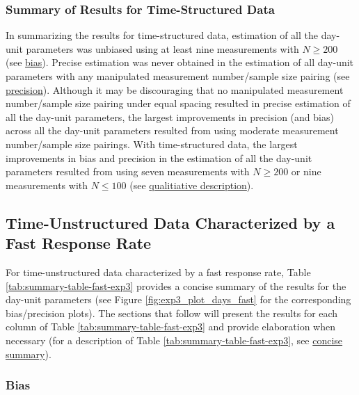 \documentclass[
12pt, %
twoside,
english]{guelphthesis}
\begin{document}
\hypertarget{summary-of-results-for-time-structured-data}{%
\subsubsection{Summary of Results for Time-Structured Data}\label{summary-of-results-for-time-structured-data}}

In summarizing the results for time-structured data, estimation of all the day-unit parameters was unbiased using at least nine measurements with \(N \ge 200\) (see \protect\hyperlink{bias-time-struc-exp3}{bias}). Precise estimation was never obtained in the estimation of all day-unit parameters with any manipulated measurement number/sample size pairing (see \protect\hyperlink{precision-time-struc-exp3}{precision}). Although it may be discouraging that no manipulated measurement number/sample size pairing under equal spacing resulted in precise estimation of all the day-unit parameters, the largest improvements in precision (and bias) across all the day-unit parameters resulted from using moderate measurement number/sample size pairings. With time-structured data, the largest improvements in bias and precision in the estimation of all the day-unit parameters resulted from using seven measurements with \(N \ge 200\) or nine measurements with \(N \le 100\) (see \protect\hyperlink{qualitative-time-struc-exp3}{qualitiative description}).

\hypertarget{time-unstructured-data-characterized-by-a-fast-response-rate}{%
\subsection{Time-Unstructured Data Characterized by a Fast Response Rate}\label{time-unstructured-data-characterized-by-a-fast-response-rate}}

For time-unstructured data characterized by a fast response rate, Table \ref{tab:summary-table-fast-exp3} provides a concise summary of the results for the day-unit parameters (see Figure \ref{fig:exp3_plot_days_fast} for the corresponding bias/precision plots). The sections that follow will present the results for each column of Table \ref{tab:summary-table-fast-exp3} and provide elaboration when necessary (for a description of Table \ref{tab:summary-table-fast-exp3}, see \protect\hyperlink{concise-example-exp3}{concise summary}).

\hypertarget{bias-fast-exp3}{%
\subsubsection{Bias}\label{bias-fast-exp3}}
\end{document}
